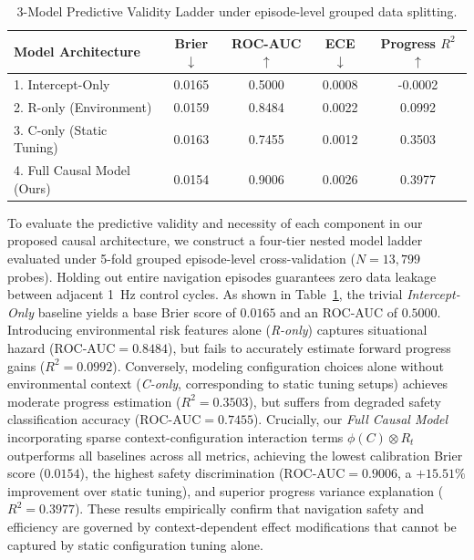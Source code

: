 \begin{table}[t]
\centering
\caption{3-Model Predictive Validity Ladder under episode-level grouped data splitting.}
\label{tab:3model_ladder}
\footnotesize
\begin{tabularx}{\columnwidth}{@{}X c c c c@{}}
\toprule
\textbf{Model Architecture} & \textbf{Brier $\downarrow$} & \textbf{ROC-AUC $\uparrow$} & \textbf{ECE $\downarrow$} & \textbf{Progress $R^2$ $\uparrow$} \\
\midrule
1. Intercept-Only & 0.0165 & 0.5000 & 0.0008 & -0.0002 \\
2. R-only (Environment) & 0.0159 & 0.8484 & 0.0022 & 0.0992 \\
3. C-only (Static Tuning) & 0.0163 & 0.7455 & 0.0012 & 0.3503 \\
4. Full Causal Model (Ours) & 0.0154 & 0.9006 & 0.0026 & 0.3977 \\
\bottomrule
\end{tabularx}
\end{table}


To evaluate the predictive validity and necessity of each component in our proposed causal architecture, we construct a four-tier nested model ladder evaluated under 5-fold grouped episode-level cross-validation ($N=13,799$ probes). Holding out entire navigation episodes guarantees zero data leakage between adjacent 1~Hz control cycles. As shown in Table~\ref{tab:3model_ladder}, the trivial \textit{Intercept-Only} baseline yields a base Brier score of $0.0165$ and an ROC-AUC of $0.5000$. Introducing environmental risk features alone (\textit{R-only}) captures situational hazard ($\text{ROC-AUC} = 0.8484$), but fails to accurately estimate forward progress gains ($R^2 = 0.0992$). Conversely, modeling configuration choices alone without environmental context (\textit{C-only}, corresponding to static tuning setups) achieves moderate progress estimation ($R^2 = 0.3503$), but suffers from degraded safety classification accuracy ($\text{ROC-AUC} = 0.7455$).
Crucially, our \textit{Full Causal Model} incorporating sparse context-configuration interaction terms $\phi(C) \otimes R_t$ outperforms all baselines across all metrics, achieving the lowest calibration Brier score ($0.0154$), the highest safety discrimination ($\text{ROC-AUC} = 0.9006$, a $+15.51\%$ improvement over static tuning), and superior progress variance explanation ($R^2 = 0.3977$). These results empirically confirm that navigation safety and efficiency are governed by context-dependent effect modifications that cannot be captured by static configuration tuning alone.